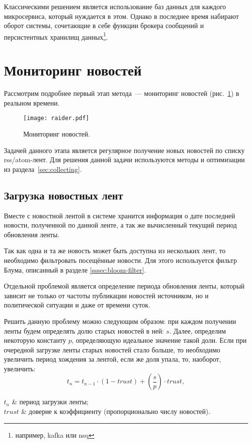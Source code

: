 Классическими решением является использование баз данных для каждого микросервиса, который нуждается в этом. Однако в последнее время набирают оборот системы, сочетающие в себе функции брокера сообщений и персистентных хранилищ данных\footnote{например, kafka или nsq}.

\section{Мониторинг новостей}
Рассмотрим подробнее первый этап метода~--- мониторинг новостей (рис.~\ref{fig:raider}) в реальном времени.

\begin{figure}[h]
    \centering
    \texttt{[image: raider.pdf]}
    \caption{Мониторинг новостей.}
    \label{fig:raider}
\end{figure}

Задачей данного этапа является регулярное получение новых новостей по списку rss/atom-лент. Для решения данной задачи используются методы и оптимизации из раздела~\ref{sec:collecting}.

\subsection{Загрузка новостных лент}
Вместе с новостной лентой в системе хранится информация о дате последней новости, полученной по данной ленте, а так же вычисленный текущий период обновления ленты.

Так как одна и та же новость может быть доступна из нескольких лент, то необходимо фильтровать посещённые новости. Для этого используется фильтр Блума, описанный в разделе \ref{sssec:bloom-filter}.

Отдельной проблемой является определение периода обновления ленты, который зависит не только от частоты публикации новостей источником, но и политической ситуации и даже от времени суток.

Решить данную проблему можно следующим образом: при каждом получении ленты будем определять долю старых новостей в ней: $s$. Далее, определим некоторую константу $p$, определяющую идеальное значение такой доли. Если при очередной загрузке ленты старых новостей стало больше, то необходимо увеличить период хождения за лентой, если же доля упала, то, наоборот, увеличить:
\begin{equation}
    t_n=t_{n-1}\cdot(1-trust)+\left(\frac{s}{p}\right)\cdot trust,
\end{equation}
\begin{conditions}
    $t_n$ & период загрузки ленты; \\
    $trust$ & доверие к коэффициенту (пропорционально числу новостей). \\
\end{conditions}


